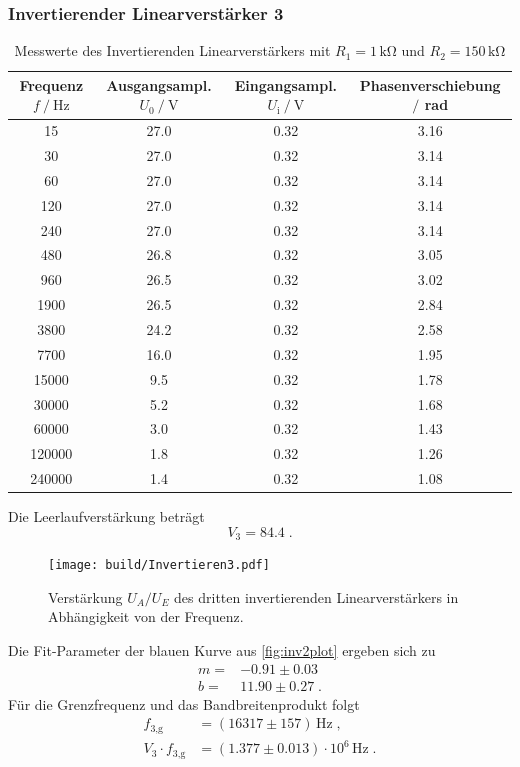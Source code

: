 \subsubsection{Invertierender Linearverstärker 3}
\label{sec:InvertierenderLinearverstärker3}

\begin{table}
    \centering
    \caption{Messwerte des Invertierenden Linearverstärkers mit $R_1=1\,\unit{\kilo\ohm}$ und $R_2=150\,\unit{\kilo\ohm}$}
    \begin{tabular}{c c c c}
        \toprule
        Frequenz $f\mathbin{/}\unit{\hertz}$ & Ausgangsampl. $U_0\mathbin{/}\unit{\volt}$& Eingangsampl. $U_{\text{i}}\mathbin{/}\unit{\volt}$ & Phasenverschiebung $\mathbin{/}$ rad\\
        \midrule
        15& 27.0&	0.32&	3.16\\		
        30&	27.0&	0.32&	3.14\\		
        60&	27.0&	0.32&	3.14\\		
        120&	27.0&	0.32&	3.14\\		
        240&	27.0&	0.32&	3.14\\		
        480&	26.8&	0.32&	3.05\\		
        960&	26.5&	0.32&	3.02\\		
        1900&	26.5&	0.32&	2.84\\	
        3800&	24.2&	0.32&	2.58\\	
        7700&	16.0&	0.32&	1.95\\	
        15000&	9.5&	0.32&	1.78\\		
        30000&	5.2&	0.32&	1.68\\		
        60000&	3.0&	0.32&	1.43\\	
        120000&	1.8&	0.32&	1.26\\	
        240000&	1.4&	0.32& 1.08	\\
        \bottomrule
    \end{tabular}
    \label{tab:InvAmp3}
\end{table}
Die Leerlaufverstärkung beträgt
\begin{equation*}
    V_3= 84.4\; .
\end{equation*}

\begin{figure}
    \centering
    \texttt{[image: build/Invertieren3.pdf]}
    \caption{Verstärkung $U_A/U_E$ des dritten invertierenden Linearverstärkers in Abhängigkeit von der Frequenz.}
    \label{fig:inv3plot}
\end{figure}
Die Fit-Parameter der blauen Kurve aus \autoref{fig:inv2plot} ergeben sich zu
\begin{align*}
    m=&-0.91\pm 0.03 \\
    b=& 11.90\pm 0.27\; .
\end{align*}
Für die Grenzfrequenz und das Bandbreitenprodukt folgt
\begin{align*}
    f_{3\text{,g}}&= (16317 \pm 157 )\, \unit{\hertz}\; ,\\
    V_3\cdot f_{3\text{,g}}&=(1.377\pm 0.013)\cdot 10^{6}\, \unit{\hertz}\;.
\end{align*}

